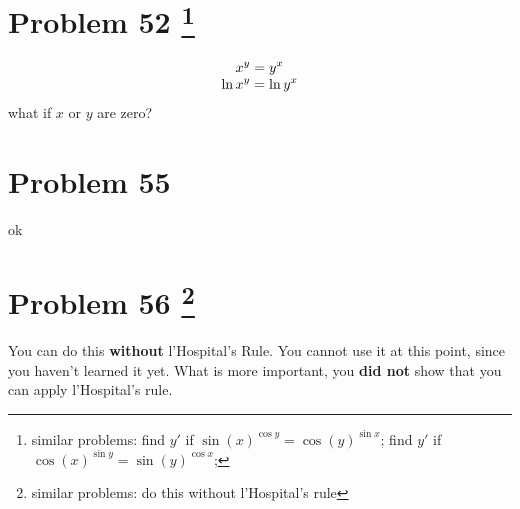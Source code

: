 \documentclass[10pt]{article} %
\begin{document}
\section*{Problem 52 \footnote{similar problems: 
	find $y'$ if $\sin(x)^{\cos y}=\cos(y)^{\sin x}$;
	find $y'$ if $\cos(x)^{\sin y}=\sin(y)^{\cos x}$;
}}
\begin{equation*}
	\begin{array}[]{c}
		\displaystyle x^y=y^x\\
		\displaystyle\ln x^y=\ln y^x
	\end{array}
\end{equation*}
what if $x$ or $y$ are zero?
\section*{Problem 55 }
ok
\section*{Problem 56  \footnote{similar problems: do this without l'Hospital's rule}}
You can do this \textbf{without} l'Hospital's Rule. You cannot use it at this point, since you haven't
learned it yet. What is more important, you \textbf{did not} show that you can apply l'Hospital's rule.
\end{document}
